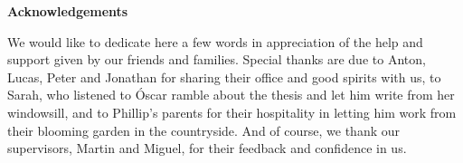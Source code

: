 \begingroup%
\makeatletter%
\cleardoublepage%
\let\newpage\relax%
\let\clearpage\relax%
\vspace*{\fill}%
\vspace*{\dimexpr-50\p@-\baselineskip}%
\begin{center}
\huge \textbf{Acknowledgements}
\end{center}

We would like to dedicate here a few words in appreciation of the help and support given by our friends and families. Special thanks are due to Anton, Lucas, Peter and Jonathan for sharing their office and good spirits with us, to Sarah, who listened to Óscar ramble about the thesis and let him write from her windowsill, and to Phillip's parents for their hospitality in letting him work from their blooming garden in the countryside. And of course, we thank our supervisors, Martin and Miguel, for their feedback and confidence in us.

\vspace*{\fill}%
\endgroup%



